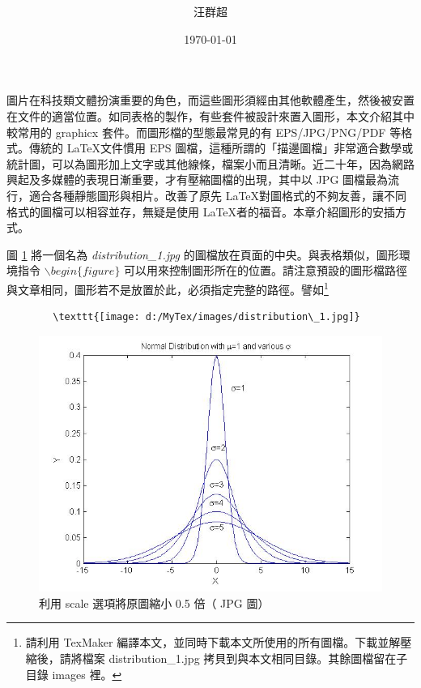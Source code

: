 
\title{ }
\author{{\SM 汪群超}}
\date{{\TT \today}} 	 

\maketitle
\fontsize{12}{22pt}\selectfont
圖片在科技類文體扮演重要的角色，而這些圖形須經由其他軟體產生，然後被安置在文件的適當位置。如同表格的製作，有些套件被設計來置入圖形，本文介紹其中較常用的 graphicx 套件。而圖形檔的型態最常見的有 EPS/JPG/PNG/PDF 等格式。傳統的 \LaTeX 文件慣用 EPS 圖檔，這種所謂的「描邊圖檔」非常適合數學或統計圖，可以為圖形加上文字或其他線條，檔案小而且清晰。近二十年，因為網路興起及多媒體的表現日漸重要，才有壓縮圖檔的出現，其中以 JPG 圖檔最為流行，適合各種靜態圖形與相片。\XeLaTeX 改善了原先 \LaTeX 對圖格式的不夠友善，讓不同格式的圖檔可以相容並存，無疑是使用 \LaTeX 者的福音。本章介紹圖形的安插方式。

圖 \ref{fig:scale} 將一個名為  \textit{distribution\_1.jpg} 的圖檔放在頁面的中央。與表格類似，圖形環境指令 $\backslash begin\{figure\}$ 可以用來控制圖形所在的位置。請注意預設的圖形檔路徑與文章相同，圖形若不是放置於此，必須指定完整的路徑。譬如\footnote{請利用  TexMaker 編譯本文，並同時下載本文所使用的所有圖檔。下載並解壓縮後，請將檔案  distribution\_1.jpg 拷貝到與本文相同目錄。其餘圖檔留在子目錄  images 裡。}

\bigskip
	\begin{lstlisting}
		\texttt{[image: d:/MyTex/images/distribution\_1.jpg]}
	\end{lstlisting}
\bigskip

\begin{figure}[h]
    \centering
        \includegraphics[scale=0.5]{distribution_1.jpg}
    \caption{利用 scale 選項將原圖縮小 0.5 倍（ JPG 圖）}
    \label{fig:scale}
\end{figure}


